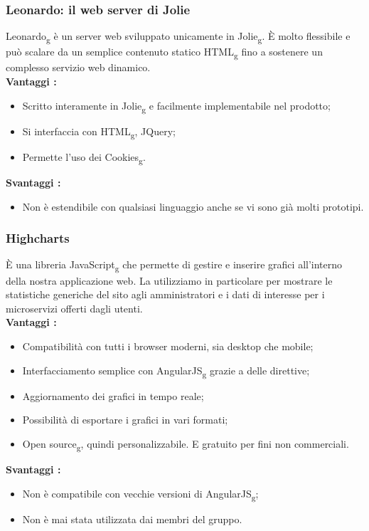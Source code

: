 {{		\subsubsection{Leonardo: il web server di Jolie}{
			Leonardo\textsubscript{g} è un server web sviluppato unicamente in Jolie\textsubscript{g}. È molto flessibile e può scalare da un semplice contenuto statico HTML\textsubscript{g} fino a sostenere un complesso servizio web dinamico.\\
			\textbf{Vantaggi :}
			\begin{itemize}\itemsep1pt
				\item Scritto interamente in Jolie\textsubscript{g} e facilmente implementabile nel prodotto;
				\item Si interfaccia con HTML\textsubscript{g}, JQuery;
				\item Permette l'uso dei Cookies\textsubscript{g}.	
			\end{itemize}
			\textbf{Svantaggi :}
			\begin{itemize}\itemsep1pt
				\item Non è estendibile con qualsiasi linguaggio anche se vi sono già molti prototipi.
			\end{itemize}
		}
		\subsubsection{Highcharts}{
			È una libreria JavaScript\textsubscript{g} che permette di gestire e inserire grafici all'interno della nostra applicazione web. La utilizziamo in particolare per mostrare le statistiche generiche del sito agli amministratori e i dati di interesse per i microservizi offerti dagli utenti. \\
			\textbf{Vantaggi :}
			\begin{itemize}\itemsep1pt
				\item Compatibilità con tutti i browser moderni, sia desktop che mobile;
				\item Interfacciamento semplice con AngularJS\textsubscript{g} grazie a delle direttive;
				\item Aggiornamento dei grafici in tempo reale;
				\item Possibilità di esportare i grafici in vari formati;
				\item Open source\textsubscript{g}, quindi personalizzabile. E gratuito per fini non commerciali.
			\end{itemize}
			\textbf{Svantaggi :}
			\begin{itemize}\itemsep1pt
				\item Non è compatibile con vecchie versioni di AngularJS\textsubscript{g};
				\item Non è mai stata utilizzata dai membri del gruppo.
			\end{itemize}
		}
}}
